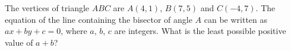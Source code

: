 The vertices of triangle $ABC$ are $A(4,1)$, $B(7,5)$ and $C(-4,7)$. The equation of the line containing the bisector of angle $A$ can be written as $ax+by+c=0$, where $a$, $b$, $c$ are integers. What is the least possible positive value of $a+b$?
